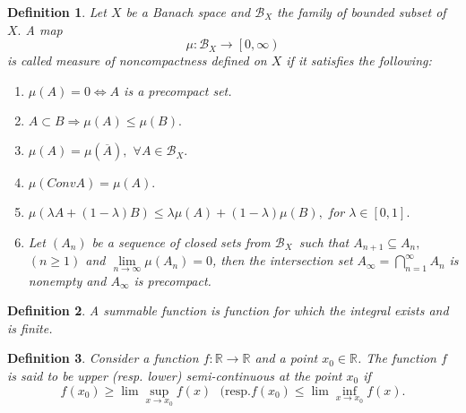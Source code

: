 \documentclass{amsart}
\theoremstyle{plain}
\newtheorem{definition}{Definition}
\numberwithin{equation}{section}
\begin{document}
\begin{definition}
\cite{banas2} Let $X$ be a Banach space and $\mathcal{B}_{X}$ the family of
bounded subset of $X.$ A map\begin{equation*}
\mu :\mathcal{B}_{X}\rightarrow \left[ 0,\infty \right)
\end{equation*}is called measure of noncompactness defined on $X$ if it satisfies the
following:

\begin{enumerate}
\item $\mu \left( A\right) =0\Leftrightarrow A$ is a precompact set.

\item $A\subset B\Rightarrow \mu \left( A\right) \leqslant \mu \left(
B\right) .$

\item $\mu \left( A\right) =\mu \left( \overline{A}\right) ,$ $\forall A\in 
\mathcal{B}_{X}.$

\item $\mu \left( ConvA\right) =\mu \left( A\right) .$

\item $\mu \left( \lambda A+\left( 1-\lambda \right) B\right) \leqslant
\lambda \mu \left( A\right) +\left( 1-\lambda \right) \mu \left( B\right) ,$
for $\lambda \in \left[ 0,1\right] .$

\item Let $\left( A_{n}\right) $ be a sequence of closed sets from $\mathcal{B}_{X}$\ such that $A_{n+1}\subseteq A_{n},$ $\left( n\geqslant 1\right) $
and $\lim\limits_{n\rightarrow \infty }\mu \left( A_{n}\right) =0$, then the
intersection set $A_{\infty }=\bigcap\limits_{n=1}^{\infty }A_{n}$ is
nonempty and $A_{\infty }$ is precompact.
\end{enumerate}
\end{definition}

\begin{definition}
A summable function is function for which the integral exists and is finite.
\end{definition}

\begin{definition}
Consider a function $f:\mathbb{R}\rightarrow \mathbb{R}$ and a point $x_{0}\in \mathbb{R}$. The function $f$ is said to be upper (resp. lower)
semi-continuous at the point $x_{0}$ if 
\begin{equation*}
f\left( x_{0}\right) \geqslant \lim \sup_{x\rightarrow x_{0}}f(x)\text{ \ \ }(\text{resp}.f(x_{0})\leq \lim \inf_{x\rightarrow x_{0}}f(x).
\end{equation*}
\end{definition}
\end{document}
